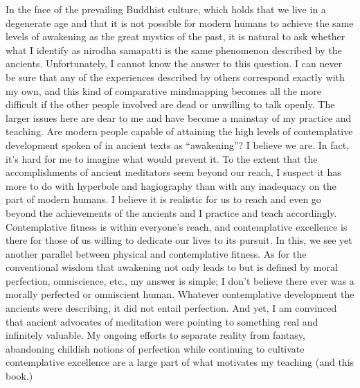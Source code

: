 \documentclass[a5paper,10pt,english]{book}
\begin{document}
\sphinxAtStartPar
In the face of the prevailing Buddhist culture, which holds that we live
in a degenerate age and that it is not possible for modern humans to
achieve the same levels of awakening as the great mystics of the past,
it is natural to ask whether what I identify as nirodha samapatti is the
same phenomenon described by the ancients. Unfortunately, I cannot know
the answer to this question. I can never be sure that any of the
experiences described by others correspond exactly with my own, and this
kind of comparative mind\sphinxhyphen{}mapping becomes all the more difficult if the
other people involved are dead or unwilling to talk openly. The larger
issues here are dear to me and have become a mainstay of my practice and
teaching. Are modern people capable of attaining the high levels of
contemplative development spoken of in ancient texts as “awakening”? I
believe we are. In fact, it’s hard for me to imagine what would prevent
it. To the extent that the accomplishments of ancient meditators seem
beyond our reach, I suspect it has more to do with hyperbole and
hagiography than with any inadequacy on the part of modern humans. I
believe it is realistic for us to reach and even go beyond the
achievements of the ancients and I practice and teach accordingly.
Contemplative fitness is within everyone’s reach, and contemplative
excellence is there for those of us willing to dedicate our lives to its
pursuit. In this, we see yet another parallel between physical and
contemplative fitness. As for the conventional wisdom that awakening not
only leads to but is defined by moral perfection, omniscience, etc., my
answer is simple; I don’t believe there ever was a morally perfected or
omniscient human. Whatever contemplative development the ancients were
describing, it did not entail perfection. And yet, I am convinced that
ancient advocates of meditation were pointing to something real and
infinitely valuable. My ongoing efforts to separate reality from
fantasy, abandoning childish notions of perfection while continuing to
cultivate contemplative excellence are a large part of what motivates my
teaching (and this book.)
\end{document}
